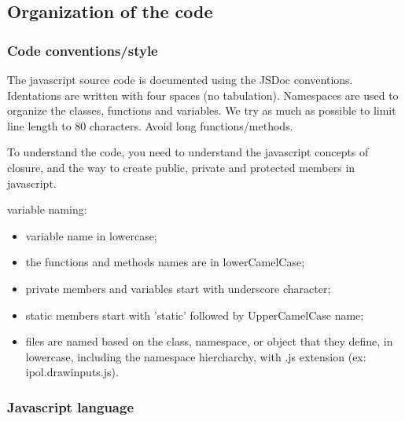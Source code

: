 \subsection{Organization of the code}

\subsubsection{Code conventions/style}

The javascript source code is documented using the JSDoc conventions.
Identations are written with four spaces (no tabulation).
Namespaces are used to organize the classes, functions and variables.
We try as much as possible to limit line length to 80 characters.
Avoid long functions/methods.

To understand the code, you need to understand the javascript concepts of closure,
and the way to create public, private and protected members in javascript.

variable naming:
\begin{itemize}
  \item variable name in lowercase;
  \item the functions and methods names are in lowerCamelCase;
  \item private members and variables start with underscore character;
  \item static members start with 'static' followed by UpperCamelCase name;
  \item files are named based on the class, namespace, or object that they define,
        in lowercase, including the namespace hiercharchy, 
        with .js extension (ex: ipol.drawinputs.js).
\end{itemize}

\subsubsection{Javascript language}

